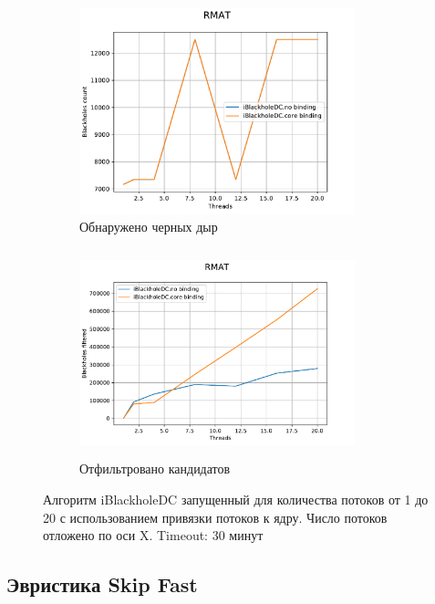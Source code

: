 \documentclass[12pt,a4paper,oneside,openany]{article}
\theoremstyle{definition}
\theoremstyle{lemma}
\theoremstyle{remark}
\begin{document}
\begin{figure}[H]
    \begin{subfigure}{.5\textwidth}
      \centering
      \includegraphics[width=8cm]{images/6_count.pdf}
      \caption{Обнаружено черных дыр}
      \label{fig:chinesebinding:count}
    \end{subfigure}
    \begin{subfigure}{.5\textwidth}
      \centering
      \includegraphics[width=8cm,height=6cm]{images/6_filtered.pdf}
      \caption{Отфильтровано кандидатов}
      \label{fig:chinesebinding:filtered}
    \end{subfigure}
    \caption{Алгоритм iBlackholeDC запущенный для количества потоков от 1 до 20 с использованием привязки потоков к ядру. Число потоков отложено по оси X. Timeout: 30 минут}
    \label{fig:chinesebinding}
\end{figure}

\subsection{Эвристика Skip Fast}\label{subsec:fastskipexperiment}
\end{document}
